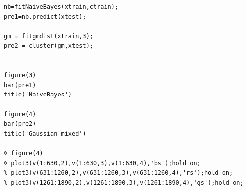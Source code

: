 \documentclass[12pt,letterpaper]{article}
\begin{document}
\begin{lstlisting}
nb=fitNaiveBayes(xtrain,ctrain);
pre1=nb.predict(xtest);

gm = fitgmdist(xtrain,3);
pre2 = cluster(gm,xtest);


figure(3)
bar(pre1)
title('NaiveBayes')

figure(4)
bar(pre2)
title('Gaussian mixed')

% figure(4)
% plot3(v(1:630,2),v(1:630,3),v(1:630,4),'bs');hold on;
% plot3(v(631:1260,2),v(631:1260,3),v(631:1260,4),'rs');hold on;
% plot3(v(1261:1890,2),v(1261:1890,3),v(1261:1890,4),'gs');hold on;





\end{lstlisting}
\end{document}
